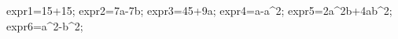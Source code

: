 \documentclass[exercice]{thedocument}%
\begin{document}
%
    \>expr1=15+15;%
    \>expr2=7a-7b;%
    \>expr3=45+9a;%
    \>expr4=a-a^2;%
    \>expr5=2a^2b+4ab^2;%
    \>expr6=a^2-b^2;%
\end{document}
